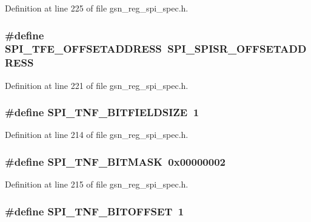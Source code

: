 Definition at line 225 of file gsn\_\-reg\_\-spi\_\-spec.h.

\hypertarget{a00573_afe8c25ea4ef0e0fe0fa2179b28a697e2}{
\subsubsection[{SPI\_\-TFE\_\-OFFSETADDRESS}]{\setlength{\rightskip}{0pt plus 5cm}\#define SPI\_\-TFE\_\-OFFSETADDRESS~SPI\_\-SPISR\_\-OFFSETADDRESS}}
\label{a00573_afe8c25ea4ef0e0fe0fa2179b28a697e2}


Definition at line 221 of file gsn\_\-reg\_\-spi\_\-spec.h.

\hypertarget{a00573_ad654c84bd9fc5590c68d3f3541b4771c}{
\subsubsection[{SPI\_\-TNF\_\-BITFIELDSIZE}]{\setlength{\rightskip}{0pt plus 5cm}\#define SPI\_\-TNF\_\-BITFIELDSIZE~1}}
\label{a00573_ad654c84bd9fc5590c68d3f3541b4771c}


Definition at line 214 of file gsn\_\-reg\_\-spi\_\-spec.h.

\hypertarget{a00573_a112fca55bbacf0c97ac5feb8d001dcb4}{
\subsubsection[{SPI\_\-TNF\_\-BITMASK}]{\setlength{\rightskip}{0pt plus 5cm}\#define SPI\_\-TNF\_\-BITMASK~0x00000002}}
\label{a00573_a112fca55bbacf0c97ac5feb8d001dcb4}


Definition at line 215 of file gsn\_\-reg\_\-spi\_\-spec.h.

\hypertarget{a00573_a17fcb52295bb50d1dd15a402412f6ab6}{
\subsubsection[{SPI\_\-TNF\_\-BITOFFSET}]{\setlength{\rightskip}{0pt plus 5cm}\#define SPI\_\-TNF\_\-BITOFFSET~1}}
\label{a00573_a17fcb52295bb50d1dd15a402412f6ab6}


